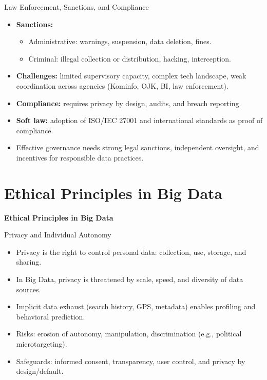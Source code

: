 \documentclass[aspectratio=169, table]{beamer}
\begin{document}
\begin{frame}{Law Enforcement, Sanctions, and Compliance}
	\vspace{20pt}
	\begin{itemize}
		\item \textbf{Sanctions:}  
		\begin{itemize}
			\item Administrative: warnings, suspension, data deletion, fines.  
			\item Criminal: illegal collection or distribution, hacking, interception.  
		\end{itemize}
		\item \textbf{Challenges:} limited supervisory capacity, complex tech landscape, weak coordination across agencies (Kominfo, OJK, BI, law enforcement).  
		\item \textbf{Compliance:} requires privacy by design, audits, and breach reporting.  
		\item \textbf{Soft law:} adoption of ISO/IEC 27001 and international standards as proof of compliance.  
		\item Effective governance needs strong legal sanctions, independent oversight, and incentives for responsible data practices.  
	\end{itemize}
\end{frame}

\section{Ethical Principles in Big Data}
\begin{frame}{\hfill}
	\centering
	\Huge{\textbf{Ethical Principles in Big Data}}
\end{frame}

\begin{frame}{Privacy and Individual Autonomy}
	\vspace{20pt}
	\begin{itemize}
		\item Privacy is the right to control personal data: collection, use, storage, and sharing.  
		\item In Big Data, privacy is threatened by scale, speed, and diversity of data sources.  
		\item Implicit data exhaust (search history, GPS, metadata) enables profiling and behavioral prediction.  
		\item Risks: erosion of autonomy, manipulation, discrimination (e.g., political microtargeting).  
		\item Safeguards: informed consent, transparency, user control, and privacy by design/default.  
	\end{itemize}
\end{frame}
\end{document}
